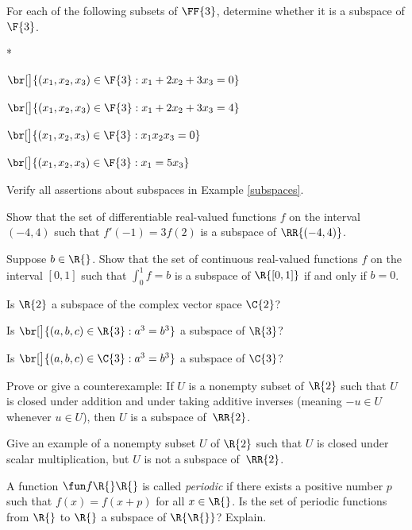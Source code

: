 
\exercise
For each of the following subsets of $\FF{3}$, determine whether it is a
subspace of $\F{3}$.
\begin{subtheorem}*
\item
$\br[\big]{ (x_1, x_2, x_3) \in \F{3}: x_1 + 2 x_2 + 3 x_3 = 0 }$

\item
$\br[\big]{ (x_1, x_2, x_3) \in \F{3}: x_1 + 2 x_2 + 3 x_3 = 4 }$

\item
$\br[\big]{ (x_1, x_2, x_3) \in \F{3}: x_1 x_2 x_3 = 0 }$

\item
$\br[\big]{ (x_1, x_2, x_3) \in \F{3}: x_1 = 5 x_3 }$
\end{subtheorem}
\exercisesubtheoremend


\exercise
Verify all assertions about subspaces in Example \ref{subspaces}.


\exercise
Show that the set of differentiable real-valued functions $f$ on the interval $(-4, 4)$ such that $f'\!(-1) = 3f(2)$ is a subspace of
$\RR{(-4, 4)}$.


\pagebreak[1]

\exercise
Suppose $b \in \R{}$. Show that the set of continuous real-valued functions $f$ on the interval $[0, 1]$ such that $\int_0^1 f = b$ is a subspace of $\R{[0, 1]}$ if and only if $b = 0$.


\exercise
Is $\R{2}$ a subspace of the complex vector space $\C{2}$?


\exercise
\begin{SUBtheorem}
\item
Is $\br[\big]{(a, b, c) \in \R{3}: a^3 =b^3}$ a subspace of $\R{3}$?
\item
Is $\br[\big]{(a, b, c) \in \C{3}: a^3 =b^3}$ a subspace of $\C{3}$?
\end{SUBtheorem}


\exercise
Prove or give a counterexample: If $U$ is a nonempty subset of $\R{2}$ such that $U$ is closed
under addition and under taking additive inverses (meaning $-u \in U$
whenever $u \in U$), then $U$ is a subspace of~$\RR{2}$.


\exercise
Give an example of a nonempty subset $U$ of $\R{2}$ such that $U$ is closed
under scalar multiplication, but $U$ is not a subspace of~$\RR{2}$.


\exercise
A function $\fun f {\R{}} {\R{}}$ is called \emph{periodic} if there exists a positive number $p$ such that $f(x) = f(x + p)$ for all $x \in \R{}$. Is the set of periodic functions from $\R{}$ to $\R{}$ a subspace of $\R{\R{}}$? Explain.


